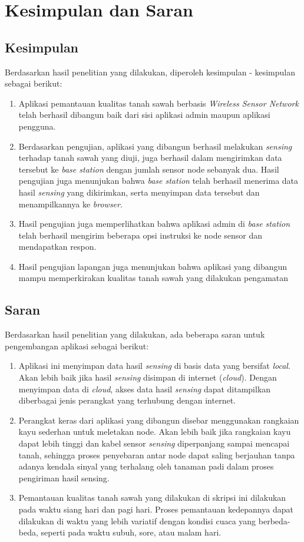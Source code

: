 \chapter{Kesimpulan dan Saran}
\label{chap:kesimpulan dan Saran}
\section{Kesimpulan}
Berdasarkan hasil penelitian yang dilakukan, diperoleh kesimpulan - kesimpulan sebagai berikut:
\begin{enumerate}
	\item Aplikasi pemantauan kualitas tanah sawah berbasis {\it Wireless Sensor Network} telah berhasil dibangun baik dari sisi aplikasi admin maupun aplikasi pengguna.
	\item Berdasarkan pengujian, aplikasi yang dibangun berhasil melakukan \textit{sensing} terhadap tanah sawah yang diuji, juga berhasil dalam mengirimkan data tersebut ke \textit{base station} dengan jumlah sensor node sebanyak dua. Hasil pengujian juga menunjukan bahwa \textit{base station} telah berhasil menerima data hasil \textit{sensing} yang dikirimkan, serta menyimpan data tersebut dan menampilkannya ke \textit{browser}. 
	\item Hasil pengujian juga memperlihatkan bahwa aplikasi admin di \textit{base station} telah berhasil mengirim beberapa opsi instruksi ke node sensor dan mendapatkan respon.
	\item Hasil pengujian lapangan juga menunjukan bahwa aplikasi yang dibangun mampu memperkirakan kualitas tanah sawah yang dilakukan pengamatan
\end{enumerate}

\section{Saran}
Berdasarkan hasil penelitian yang dilakukan, ada beberapa saran untuk pengembangan aplikasi sebagai berikut:
\begin{enumerate}
	\item Aplikasi ini menyimpan data hasil \textit{sensing} di basis data yang bersifat \textit{local}. Akan lebih baik jika hasil \textit{sensing} disimpan di internet (\textit{cloud}). Dengan menyimpan data di \textit{cloud}, akses data hasil \textit{sensing} dapat ditampilkan diberbagai jenis perangkat yang terhubung dengan internet. 
	\item Perangkat keras dari aplikasi yang dibangun disebar menggunakan rangkaian kayu sederhan untuk meletakan node. Akan lebih baik jika rangkaian kayu dapat lebih tinggi dan kabel sensor \textit{sensing} diperpanjang sampai mencapai tanah, sehingga proses penyebaran antar node dapat saling berjauhan tanpa adanya kendala sinyal yang terhalang oleh tanaman padi dalam proses pengiriman hasil sensing.
	\item Pemantauan kualitas tanah sawah yang dilakukan di skripsi ini dilakukan pada waktu siang hari dan pagi hari. Proses pemantauan kedepannya dapat dilakukan di waktu yang lebih variatif dengan kondisi cuaca yang berbeda-beda, seperti pada waktu subuh, sore, atau malam hari.
\end{enumerate}